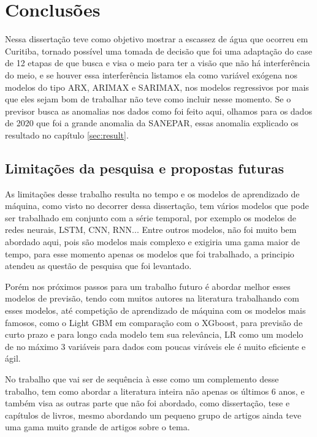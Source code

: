 \section{Conclusões} \label{sec:conclusoes}

Nessa dissertação teve como objetivo mostrar a escassez de água que ocorreu em Curitiba, tornado possível uma tomada de decisão que foi uma adaptação do case de 12 etapas de  que busca e visa o meio para ter a visão que não há interferência do meio, e se houver essa interferência listamos ela como variável exógena nos modelos do tipo ARX, ARIMAX e SARIMAX, nos modelos regressivos por mais que eles sejam bom de trabalhar não teve como incluir nesse momento.  Se o previsor busca as anomalias nos dados como foi feito aqui, olhamos para os dados de 2020 que foi a grande anomalia da SANEPAR, essas anomalia explicado os resultado no capítulo \ref{sec:result}. 


    \subsection{Limitações da pesquisa e propostas futuras}

As limitações desse trabalho resulta no tempo e os modelos de aprendizado de máquina, como visto no decorrer dessa dissertação, tem vários modelos que pode ser trabalhado em conjunto com a série temporal, por exemplo os modelos de redes neurais, LSTM, CNN, RNN... Entre outros modelos, não foi muito bem abordado aqui, pois são modelos mais complexo e exigiria uma gama maior de tempo, para esse momento apenas os modelos que foi trabalhado, a principio atendeu as questão de pesquisa que foi levantado.

Porém nos próximos passos para um trabalho futuro é abordar melhor esses modelos de previsão, tendo com muitos autores na literatura trabalhando com esses modelos, até competição de aprendizado de máquina com os modelos mais famosos, como o Light GBM em comparação com o XGboost, para previsão de curto prazo e para longo cada modelo tem sua relevância, LR como um modelo de no máximo 3 variáveis para dados com poucas viráveis ele é muito eficiente e ágil.

No trabalho que vai ser de sequência à esse como um complemento desse trabalho, tem como abordar a literatura inteira não apenas os últimos 6 anos, e também visa as outras parte que não foi abordado, como dissertação, tese e capítulos de livros, mesmo abordando um pequeno grupo de artigos ainda teve uma gama muito grande de artigos sobre o tema. 

